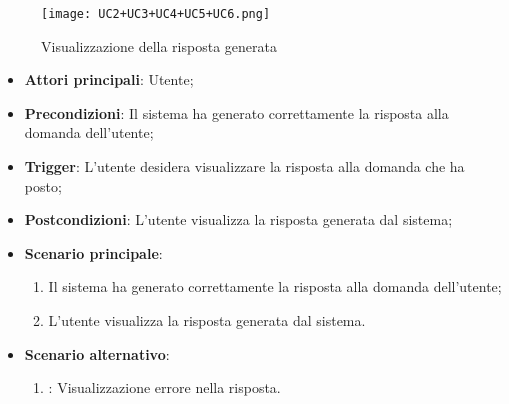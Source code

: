 \begin{figure}[h]
    \centering
    \texttt{[image: UC2+UC3+UC4+UC5+UC6.png]}
    \caption{Visualizzazione della risposta generata}
\end{figure}

\begin{itemize}
    \item \textbf{Attori principali}: Utente;
    \item \textbf{Precondizioni}: Il sistema ha generato correttamente la risposta alla domanda dell'utente;
    \item \textbf{Trigger}: L'utente desidera visualizzare la risposta alla domanda che ha posto;
    \item \textbf{Postcondizioni}: L'utente visualizza la risposta generata dal sistema;
    \item \textbf{Scenario principale}:
    \begin{enumerate}
        \item Il sistema ha generato correttamente la risposta alla domanda dell'utente;
        \item L'utente visualizza la risposta generata dal sistema.
    \end{enumerate}
    \item \textbf{Scenario alternativo}:
    \begin{enumerate}
        \item {}: Visualizzazione errore nella risposta.
    \end{enumerate}
\end{itemize}

\hypertarget{UC3}{}
